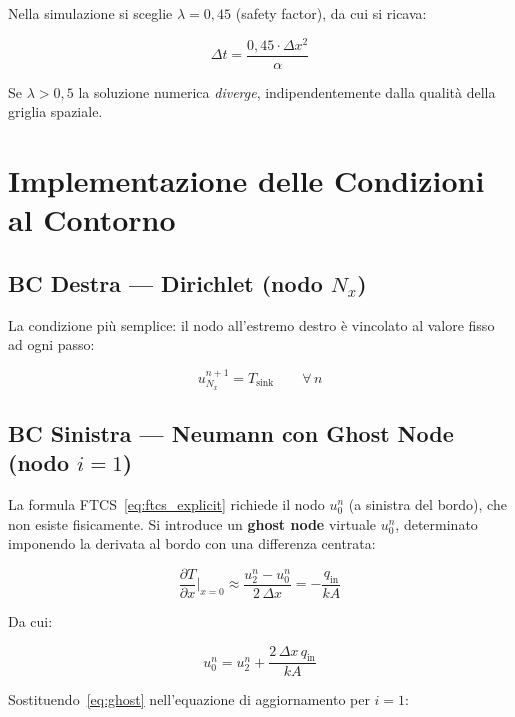 \documentclass[11pt, a4paper]{article}
\begin{document}
Nella simulazione si sceglie $\lambda = 0{,}45$ (safety factor), da cui si ricava:

\begin{equation}
  \Delta t = \frac{0{,}45 \cdot \Delta x^2}{\alpha}
  \label{eq:dt}
\end{equation}

Se $\lambda > 0{,}5$ la soluzione numerica \emph{diverge}, indipendentemente dalla qualità della griglia spaziale.

\section{Implementazione delle Condizioni al Contorno}

\subsection{BC Destra — Dirichlet (nodo $N_x$)}

La condizione più semplice: il nodo all'estremo destro è vincolato al valore fisso ad ogni passo:

\begin{equation}
  u_{N_x}^{n+1} = T_\text{sink} \qquad \forall\, n
  \label{eq:dirichlet_impl}
\end{equation}

\subsection{BC Sinistra — Neumann con Ghost Node (nodo $i=1$)}

La formula FTCS~\eqref{eq:ftcs_explicit} richiede il nodo $u_0^n$ (a sinistra del bordo), che non esiste fisicamente. Si introduce un \textbf{ghost node} virtuale $u_0^n$, determinato imponendo la derivata al bordo con una differenza centrata:

\begin{equation}
  \frac{\partial T}{\partial x}\bigg|_{x=0} \approx \frac{u_2^n - u_0^n}{2\,\Delta x} = -\frac{q_\text{in}}{k A}
\end{equation}

Da cui:

\begin{equation}
  u_0^n = u_2^n + \frac{2\,\Delta x\, q_\text{in}}{k A}
  \label{eq:ghost}
\end{equation}

Sostituendo~\eqref{eq:ghost} nell'equazione di aggiornamento per $i=1$:
\end{document}
